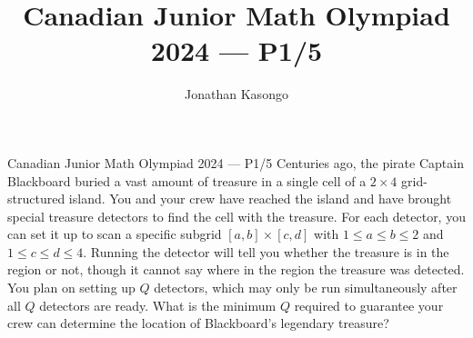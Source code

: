 \documentclass{article}
\author{Jonathan Kasongo}
\title{Canadian Junior Math Olympiad 2024 --- P1/5}
\begin{document}
\maketitle

\begin{problem}{Canadian Junior Math Olympiad 2024 --- P1/5}
Centuries ago, the pirate Captain Blackboard buried a vast amount of treasure in a
single cell of a $2 \times 4$ grid-structured island. You and your crew have reached the island
and have brought special treasure detectors to find the cell with the treasure. For each
detector, you can set it up to scan a specific subgrid $[a, b] \times [c, d]$ with $1 \leq a \leq b \leq 2$
and $1 \leq c \leq d \leq 4$. Running the detector will tell you whether the treasure is in the
region or not, though it cannot say where in the region the treasure was detected. You
plan on setting up $Q$ detectors, which may only be run simultaneously after all $Q$
detectors are ready. What is the minimum $Q$ required to guarantee your crew can
determine the location of Blackboard’s legendary treasure?
\end{problem}
\end{document}
